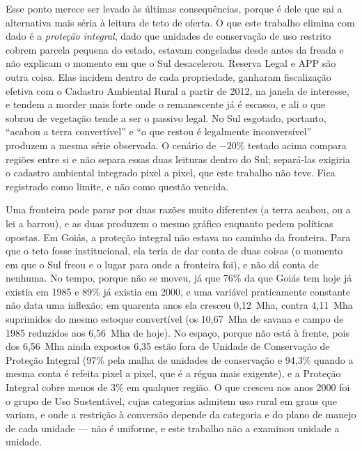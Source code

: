 Esse ponto merece ser levado às últimas consequências, porque é dele que sai a
alternativa mais séria à leitura de teto de oferta. O que este trabalho
elimina com dado é a \emph{proteção integral}, dado que unidades de conservação de uso restrito cobrem
parcela pequena do estado, estavam congeladas desde antes da freada e não
explicam o momento em que o Sul desacelerou. Reserva Legal e APP são outra
coisa. Elas incidem dentro de cada propriedade, ganharam fiscalização efetiva
com o Cadastro Ambiental Rural a partir de 2012, na janela de interesse, e
tendem a morder mais forte onde o remanescente já é escasso, e ali o que sobrou
de vegetação tende a ser o passivo legal. No Sul esgotado, portanto, ``acabou
a terra convertível'' e ``o que restou é legalmente inconversível'' produzem a
mesma série observada. O cenário de $-20\%$ testado acima compara regiões
entre si e não separa essas duas leituras dentro do Sul; separá-las exigiria o
cadastro ambiental integrado pixel a pixel, que este trabalho não teve. Fica
registrado como limite, e não como questão vencida.

Uma fronteira pode parar por duas razões muito diferentes (a terra acabou,
ou a lei a barrou), e as duas produzem o mesmo gráfico enquanto pedem
políticas opostas. Em Goiás, a proteção integral não estava no caminho da
fronteira. Para que o teto fosse institucional, ela teria de dar conta de duas
coisas (o momento em que o Sul freou e o lugar para onde a fronteira foi),
e não dá conta de nenhuma. No tempo, porque não se moveu, já que 76\% da que
Goiás tem hoje já existia em 1985 e 89\% já existia em 2000, e uma variável
praticamente constante não data uma inflexão; em quarenta anos ela cresceu
0,12~Mha, contra 4,11~Mha suprimidos do mesmo estoque convertível (os
10,67~Mha de savana e campo de 1985 reduzidos aos 6,56~Mha de hoje). No
espaço, porque não está à frente, pois dos 6,56~Mha ainda expostos 6,35 estão fora
de Unidade de Conservação de Proteção Integral (97\% pela malha de unidades
de conservação e 94,3\% quando a mesma conta é refeita pixel a pixel, que é a
régua mais exigente), e a Proteção Integral cobre menos de 3\% em qualquer
região. O que cresceu nos anos 2000 foi
o grupo de Uso Sustentável, cujas categorias admitem uso rural em graus que
variam, e onde a restrição à conversão depende da categoria e do plano de
manejo de cada unidade --- não é uniforme, e este trabalho não a examinou
unidade a unidade.

